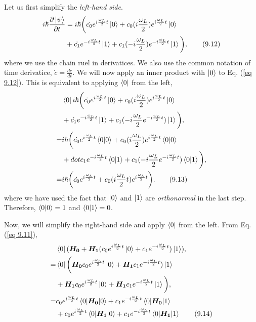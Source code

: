 \documentclass{article}
\begin{document}
Let us first simplify the \textit{left-hand side}.
\begin{align*}\label{eq 9.12}
    i\hbar\frac{\partial \ket{\psi}}{\partial t}&=i\hbar\bigg( \dot{c_0}e^{i\frac{\omega_L}{2}t}\ket{0}+c_0(i\frac{\omega_L}{2})e^{i\frac{\omega_L}{2}t}\ket{0}\\
    &+\dot{c_1}e^{-i\frac{\omega_L}{2}t}\ket{1}+c_1(-i\frac{\omega_L}{2})e^{-i\frac{\omega_L}{2}t}\ket{1} \bigg),   \tag{9.12}
\end{align*}
where we use the chain ruel in derivatices. We also use the common notation of time derivatice,
$\dot{c}=\frac{dc}{dt}$. We will now apply an inner product with $\ket{0}$ to Eq. (\ref{eq 9.12}).
This is equivalent to applying $\bra{0}$ from the left,
\begin{align*}\label{eq 9.13}
    &\bra{0}i\hbar\bigg( \dot{c_0}e^{i\frac{\omega_L}{2}t}\ket{0}+c_0(i\frac{\omega_L}{2})e^{i\frac{\omega_L}{2}t}\ket{0}\\
    &+\dot{c_1}e^{-i\frac{\omega_L}{2}t}\ket{1}+c_1(-i\frac{\omega_L}{2}e^{-i\frac{\omega_L}{2}t})\ket{1}\bigg),\\
    =&i\hbar\bigg(\dot{c_0}e^{i\frac{\omega_L}{2}t}\braket{0|0}+c_0(i\frac{\omega_L}{2})e^{i\frac{\omega_L}{2}t}\braket{0|0}\\
    &+dot{c_1}e^{-i\frac{\omega_L}{2}t}\braket{0|1}+c_1(-i\frac{\omega_L}{2}e^{-i\frac{\omega_L}{2}t})\braket{0|1}\bigg),\\
    =&i\hbar\bigg(\dot{c_0}e^{i\frac{\omega_L}{2}t}+c_0(i\frac{\omega_L}{2}t)e^{i\frac{\omega_L}{2}t}\bigg).\tag{9.13}
\end{align*}
where we have used the fact that $\ket{0}$ and $\ket{1}$ are \textit{orthonormal} in the last step.
Therefore, $\braket{0|0}=1$ and $\braket{0|1}=0$.

Now, we will simplify the right-hand side and apply $\bra{0}$ from the left. From Eq. (\ref{eq 9.11}),
\begin{align*}\label{eq 9.14}
    &\bra{0}(\boldsymbol{H_0}+\boldsymbol{H_1}(c_0e^{i\frac{\omega_L}{2}t}\ket{0}+c_1e^{-i\frac{\omega_L}{2}t})\ket{1}),\\
    =&\bra{0}\bigg(\boldsymbol{H_0}c_0e^{i\frac{\omega_L}{2}t}\ket{0}+\boldsymbol{H_1}c_1e^{-i\frac{\omega_L}{2}t})\ket{1}\\
    &+\boldsymbol{H_1}c_0e^{i\frac{\omega_L}{2}t}\ket{0}+\boldsymbol{H_1}c_1e^{-i\frac{\omega_L}{2}t}\ket{1}\bigg),\\
    =&c_0e^{i\frac{\omega_L}{2}t}\braket{0|\boldsymbol{H_0}|0}+c_1e^{-i\frac{\omega_L}{2}t}\braket{0|\boldsymbol{H_0}|1}\\
    &+c_0e^{i\frac{\omega_L}{2}t}\braket{0|\boldsymbol{H_1}|0}+c_1e^{-i\frac{\omega_L}{2}t}\braket{0|\boldsymbol{H_1}|1} \tag{9.14}
\end{align*}
\end{document}
